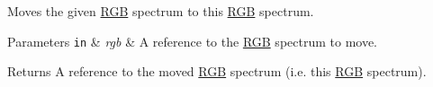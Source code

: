 Moves the given \hyperlink{structmage_1_1_r_g_b}{R\+GB} spectrum to this \hyperlink{structmage_1_1_r_g_b}{R\+GB} spectrum.


\begin{DoxyParams}[1]{Parameters}
\mbox{\tt in}  & {\em rgb} & A reference to the \hyperlink{structmage_1_1_r_g_b}{R\+GB} spectrum to move. \\
\hline
\end{DoxyParams}
\begin{DoxyReturn}{Returns}
A reference to the moved \hyperlink{structmage_1_1_r_g_b}{R\+GB} spectrum (i.\+e. this \hyperlink{structmage_1_1_r_g_b}{R\+GB} spectrum). 
\end{DoxyReturn}
